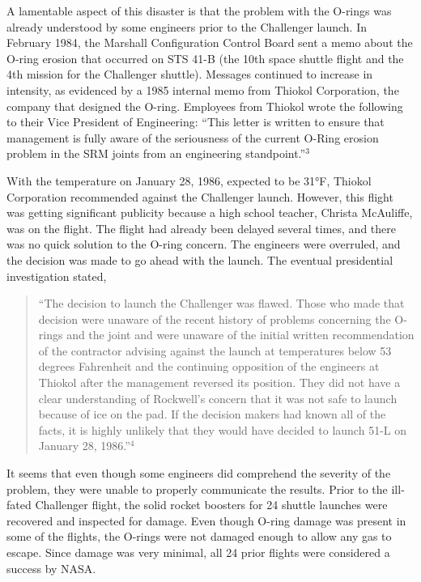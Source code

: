 \documentclass[
]{report}
\begin{document}
A lamentable aspect of this disaster is that the problem with the O-rings was already understood by
some engineers prior to the Challenger launch. In February 1984, the Marshall Configuration Control
Board sent a memo about the O-ring erosion that occurred on STS 41-B (the 10th space shuttle flight and
the 4th mission for the Challenger shuttle). Messages continued to increase in intensity, as evidenced by
a 1985 internal memo from Thiokol Corporation, the company that designed the O-ring. Employees from
Thiokol wrote the following to their Vice President of Engineering: ``This letter is written to ensure that
management is fully aware of the seriousness of the current O-Ring erosion problem in the SRM joints
from an engineering standpoint.''\(^3\)

With the temperature on January 28, 1986, expected to be 31°F, Thiokol Corporation recommended
against the Challenger launch. However, this flight was getting significant publicity because a high school
teacher, Christa McAuliffe, was on the flight. The flight had already been delayed several times, and there
was no quick solution to the O-ring concern. The engineers were overruled, and the decision was made to go
ahead with the launch. The eventual presidential investigation stated,

\begin{quote}
``The decision to launch the Challenger was flawed. Those who made that decision were unaware of
the recent history of problems concerning the O-rings and the joint and were unaware of the initial
written recommendation of the contractor advising against the launch at temperatures below 53
degrees Fahrenheit and the continuing opposition of the engineers at Thiokol after the management
reversed its position. They did not have a clear understanding of Rockwell's concern that it was not
safe to launch because of ice on the pad. If the decision makers had known all of the facts, it is highly
unlikely that they would have decided to launch 51-L on January 28, 1986.''\(^4\)
\end{quote}

It seems that even though some engineers did comprehend the severity of the problem, they were unable
to properly communicate the results. Prior to the ill-fated Challenger flight, the solid rocket boosters for 24
shuttle launches were recovered and inspected for damage. Even though O-ring damage was present in some
of the flights, the O-rings were not damaged enough to allow any gas to escape. Since damage was very
minimal, all 24 prior flights were considered a success by NASA.
\end{document}
